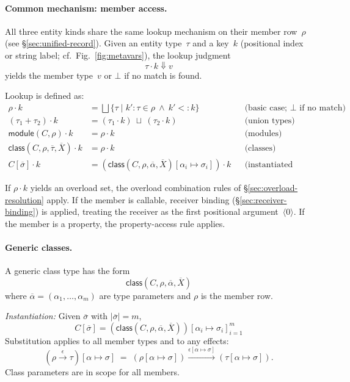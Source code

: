 \paragraph{Common mechanism: member access.}
All three entity kinds share the same lookup mechanism on their member row~$\rho$ (see \S\ref{sec:unified-record}).  
Given an entity type~$\tau$ and a key~$k$ (positional index or string label; cf.\ Fig.~\ref{fig:metavars}), the lookup judgment
\[
\tau \cdot k \Downarrow v
\]
yields the member type~$v$ or $\bot$ if no match is found.

Lookup is defined as:
\begin{align*}
\rho \cdot k &= \bigsqcup \{\tau \mid k'{:}\tau \in \rho \ \wedge\ k' <: k \}
  &&\text{(basic case; $\bot$ if no match)}\\
(\tau_1 + \tau_2) \cdot k &= (\tau_1 \cdot k) \ \sqcup\ (\tau_2 \cdot k)
  &&\text{(union types)} \\
\mathsf{module}(C, \rho) \cdot k &= \rho \cdot k
  &&\text{(modules)}\\
\mathsf{class}(C, \rho, \overline{\tau}, \overline{X}) \cdot k &= \rho \cdot k
  &&\text{(classes)}\\
C[\overline{\sigma}] \cdot k &= (\mathsf{class}(C, \rho, \overline{\alpha}, \overline{X})[\alpha_i \mapsto \sigma_i]) \cdot k
  &&\text{(instantiated classes)}
\end{align*}

If $\rho \cdot k$ yields an overload set, the overload combination rules of \S\ref{sec:overload-resolution} apply.  
If the member is callable, receiver binding (\S\ref{sec:receiver-binding}) is applied, treating the receiver as the first positional argument~$\langle 0\rangle$.  
If the member is a property, the property-access rule applies.

\paragraph{Generic classes.}
A generic class type has the form
\[
\mathsf{class}(C, \rho, \overline{\alpha}, \overline{X})
\]
where $\overline{\alpha} = (\alpha_1,\dots,\alpha_m)$ are type parameters and $\rho$ is the member row.

\emph{Instantiation:} Given $\overline{\sigma}$ with $|\overline{\sigma}| = m$,
\[
C[\overline{\sigma}] = (\mathsf{class}(C, \rho, \overline{\alpha}, \overline{X}))[\alpha_i \mapsto \sigma_i]_{i=1}^m
\]
Substitution applies to all member types and to any effects:
\[
(\rho \xrightarrow{\epsilon} \tau)[\alpha \mapsto \sigma] \;=\; (\rho[\alpha \mapsto \sigma]) \xrightarrow{\epsilon[\alpha \mapsto \sigma]} (\tau[\alpha \mapsto \sigma]).
\]
Class parameters are in scope for all members.

